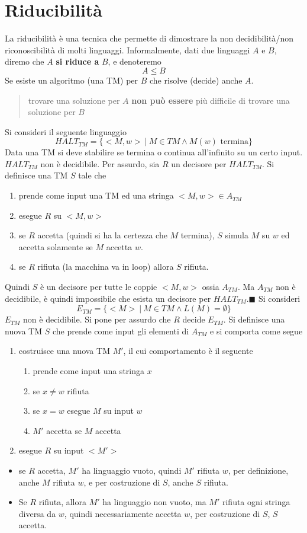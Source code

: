 \documentclass[10pt, letterpaper]{report}
\begin{document}
\section{Riducibilità}
La riducibilità è una tecnica che permette di dimostrare la non decidibilità/non riconoscibilità di molti linguaggi. Informalmente, dati due linguaggi $A$ e $B$,  diremo che $A$ \textbf{si riduce a} $B$, e denoteremo $$ A\le B$$ Se esiste un algoritmo (una TM) per $B$ che risolve (decide) anche $A$.\begin{quotation}
    trovare una soluzione per $A$ \textbf{non può essere} più difficile di trovare una soluzione per $B$
\end{quotation}
Si consideri il seguente linguaggio 
$$ HALT_{TM}=\{<M,w> \ | \ M\in TM\land M(w)\text{ termina} \}$$
Data una TM si deve stabilire se termina o continua all'infinito su un certo input.\acc 
{} $HALT_{TM}$ non è decidibile.\acc 
\dimo{} Per assurdo, sia $R$ un decisore per $HALT_{TM}$. Si definisce una TM $S$ tale che \begin{enumerate}
    \item prende come input una TM ed una stringa $<M,w>\in A_{TM}$
    \item esegue $R$ su $<M,w>$
    \item se $R$ accetta (quindi si ha la certezza che $M$ termina), $S$ simula $M$ su $w$ ed accetta solamente se $M$ accetta $w$.
    \item se $R$ rifiuta (la macchina va in loop) allora $S$ rifiuta.
\end{enumerate}
Quindi $S$ è un decisore per tutte le coppie $<M,w>$ ossia $A_{TM}$. Ma $A_{TM}$ non è decidibile, è quindi impossibile che esista un decisore per $HALT_{TM}$.\hfill$\blacksquare$\acc 
Si consideri 
$$ E_{TM}=\{<M>\ | \ M\in TM \land L(M)=\emptyset\}$$
\prop{} $E_{TM}$ non è decidibile.\acc 
\dimo{} Si pone per assurdo che $R$ decide $E_{TM}$. Si definisce una nuova TM $S$ che prende come input gli elementi di $A_{TM}$ e si comporta come segue \begin{enumerate}
    \item costruisce una nuova TM $M'$, il cui comportamento è il seguente\begin{enumerate}
        \item prende come input una stringa $x$
        \item se $x\ne w$ rifiuta 
        \item se $x=w$ esegue $M$ su input $w$
        \item $M'$ accetta se $M$ accetta
    \end{enumerate}
    \item esegue $R$ su input $<M'>$\end{enumerate}\begin{itemize}
    \item se $R$ accetta, $M'$ ha linguaggio vuoto, quindi $M'$ rifiuta $w$, per definizione, anche $M$ rifiuta $w$, e per costruzione di $S$, anche $S$ rifiuta.\item Se $R$ rifiuta, allora $M'$ ha linguaggio non vuoto, ma $M'$ rifiuta ogni stringa diversa da $w$, quindi necessariamente accetta $w$, per costruzione di $S$, $S$ accetta.
\end{itemize}
\end{document}
